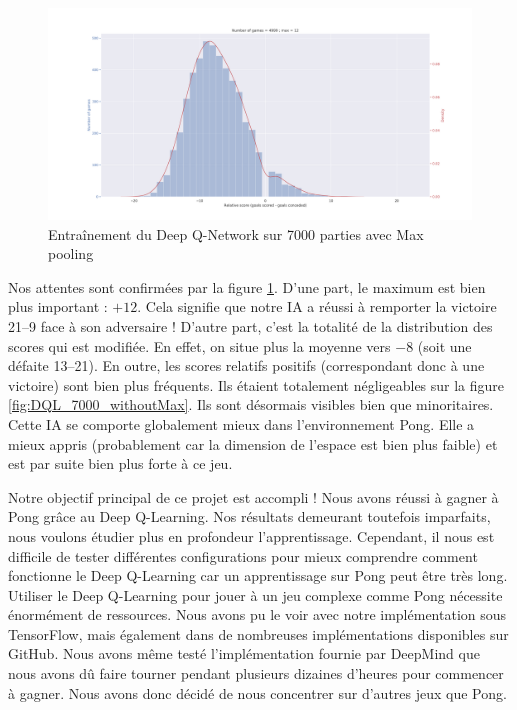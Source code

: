\begin{figure}[h]
 \centering
 \includegraphics[width  = \textwidth]{img/DQL_7000_withMax.png}
 \caption{Entraînement du Deep Q-Network sur 7000 parties avec Max pooling}
 \label{fig:DQL_7000_withMax}
\end{figure}

Nos attentes sont confirmées par la figure \ref{fig:DQL_7000_withMax}. D'une part, le maximum est bien plus important : $+\num{12}$. Cela signifie que notre IA a 
réussi à remporter la victoire 21--9 face à son adversaire ! D'autre part, c'est la totalité de la distribution des scores qui est modifiée. En effet, on situe 
plus la moyenne vers $\num{-8}$ (soit une défaite 13--21). En outre, les scores relatifs positifs (correspondant donc à une victoire) sont bien plus fréquents. Ils
étaient totalement négligeables sur la figure \ref{fig:DQL_7000_withoutMax}. Ils sont désormais visibles bien que minoritaires. Cette IA se comporte
globalement mieux dans l'environnement Pong. Elle a mieux appris (probablement car la dimension de l'espace est bien plus faible) et est par suite bien plus forte
à ce jeu.

Notre objectif principal de ce projet est accompli ! Nous avons réussi à gagner à Pong grâce au Deep Q-Learning. Nos résultats demeurant toutefois imparfaits, nous
voulons étudier plus en profondeur l'apprentissage. Cependant, il nous est difficile de tester différentes configurations pour mieux comprendre comment fonctionne le Deep Q-Learning car un apprentissage sur Pong peut être très long. Utiliser le Deep Q-Learning pour jouer à un jeu complexe comme Pong nécessite énormément de ressources. Nous avons pu le voir avec notre implémentation sous TensorFlow, mais également dans de nombreuses implémentations disponibles sur GitHub. Nous avons même testé l'implémentation fournie par DeepMind que nous avons dû faire tourner pendant plusieurs dizaines d'heures pour commencer à gagner. Nous avons donc décidé de nous concentrer sur d'autres jeux que Pong.


